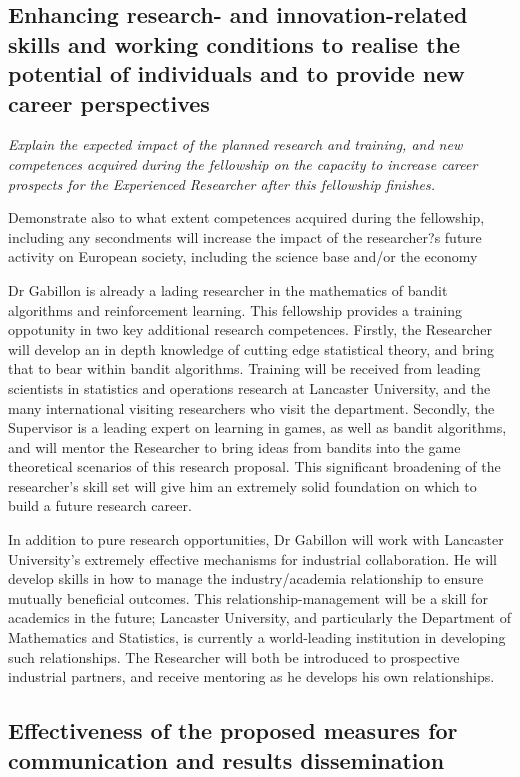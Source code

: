 \documentclass[a4paper,11pt]{article}
\begin{document}
\subsection{Enhancing research- and innovation-related skills and working conditions to realise the potential of individuals and to provide new career perspectives}
\label{sec:enhancement}

{\em
Explain the expected impact of the planned research and training, and new competences acquired during the fellowship on the capacity to increase career prospects for the Experienced Researcher after this fellowship finishes.

Demonstrate also to what extent competences acquired during the fellowship, including any secondments will increase the impact of the researcher?s future activity on European society, including the science base and/or the economy
}

Dr Gabillon is already a lading researcher in the mathematics of bandit algorithms and reinforcement learning.  This fellowship provides a training oppotunity in two key additional research competences.  Firstly, the Researcher will develop an in depth knowledge of cutting edge statistical theory, and bring that to bear within bandit algorithms.  Training will be received from leading scientists in statistics and operations research at Lancaster University, and the many international visiting researchers who visit the department.   Secondly, the Supervisor is a leading expert on learning in games, as well as bandit algorithms, and will mentor the Researcher to bring ideas from bandits into the game theoretical scenarios of this research proposal.  This significant broadening of the researcher's skill set will give him an extremely solid foundation on which to build a future research career.

In addition to pure research opportunities, Dr Gabillon will work with Lancaster University's extremely effective mechanisms for industrial collaboration.  He will develop skills in how to manage the industry/academia relationship to ensure mutually beneficial outcomes.  This relationship-management will be a skill for academics in the future; Lancaster University, and particularly the Department of Mathematics and Statistics, is currently a world-leading institution in developing such relationships.  The Researcher will both be introduced to prospective industrial partners, and receive mentoring as he develops his own relationships.


\subsection{Effectiveness of the proposed measures for communication and results dissemination}
\end{document}

